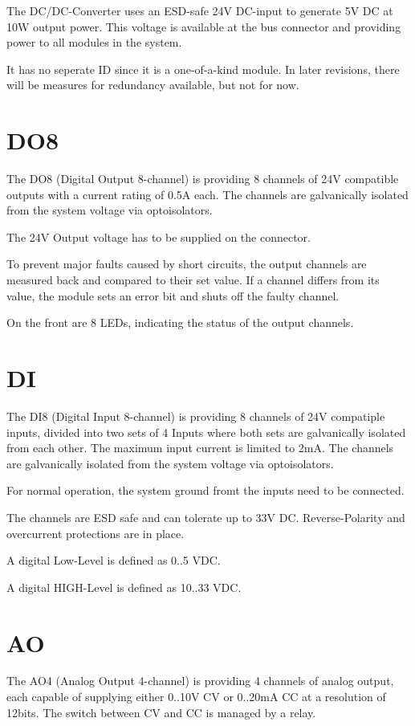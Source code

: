 The DC/DC-Converter uses an ESD-safe 24V DC-input to generate 5V DC at 10W output power. This voltage is available at the bus connector and providing power to all modules in the system.

It has no seperate ID since it is a one-of-a-kind module. In later revisions, there will be measures for redundancy available, but not for now.

\section{DO8}
The DO8 (Digital Output 8-channel) is providing 8 channels of 24V compatible outputs with a current rating of 0.5A each. The channels are galvanically isolated from the system voltage via optoisolators. 

The 24V Output voltage has to be supplied on the connector. 

To prevent major faults caused by short circuits, the output channels are measured back and compared to their set value. If a channel differs from its value, the module sets an error bit and shuts off the faulty channel.

On the front are 8 LEDs, indicating the status of the output channels. 


\section{DI}
The DI8 (Digital Input 8-channel) is providing 8 channels of 24V compatiple inputs, divided into two sets of 4 Inputs where both sets are galvanically isolated from each other. The maximum input current is limited to 2mA. The channels are galvanically isolated from the system voltage via optoisolators.

For normal operation, the system ground fromt the inputs need to be connected. 

The channels are ESD safe and can tolerate up to 33V DC. Reverse-Polarity and overcurrent protections are in place. 

A digital Low-Level is defined as 0..5 VDC.

A digital HIGH-Level is defined as 10..33 VDC.


\section{AO}
The AO4 (Analog Output 4-channel) is providing 4 channels of analog output, each capable of supplying either 0..10V CV or 0..20mA CC at a resolution of 12bits. The switch between CV and CC is managed by a relay.

